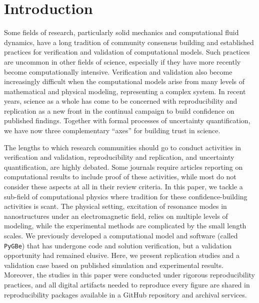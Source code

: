 \documentclass{rstransa} %
\newcommand{\pygbe}{\texttt{PyGBe}\xspace}
\begin{document}
    
\begin{fmtext}  



\end{fmtext}

\maketitle

\section{Introduction}

Some fields of research, particularly solid mechanics and computational fluid dynamics, have a long tradition of community consensus building and established practices for verification and validation of computational models. 
Such practices are uncommon in other fields of science, especially if they have more recently become computationally intensive.
Verification and validation also become increasingly difficult when the computational models arise from many levels of mathematical and physical modeling, representing a complex system. 
In recent years, science as a whole has come to be concerned with reproducibility and replication as a new front in the continual campaign to build confidence on published findings. 
Together with formal processes of uncertainty quantification, we have now three complementary ``axes'' for building trust in science. 

The lengths to which research communities should go to conduct activities in verification and validation, reproducibility and replication, and uncertainty quantification, are highly debated. 
Some journals require articles reporting on computational results to include proof of these activities, while most do not consider these aspects at all in their review criteria. 
In this paper, we tackle a sub-field of computational physics where tradition for these confidence-building activities is scant. 
The physical setting, excitation of resonance modes in nanostructures under an electromagnetic field, relies on multiple levels of modeling, while the experimental methods are complicated by the small length scales. 
We previously developed a computational model and software (called \pygbe) that has undergone code and solution verification, but a validation opportunity had remained elusive. 
Here, we present replication studies and a validation case based on published simulation and experimental results. 
Moreover, the studies in this paper were conducted under rigorous reproducibility practices, and all digital artifacts needed to reproduce every figure are shared in reproducibility packages available in a GitHub repository and archival services. 
\end{document}
